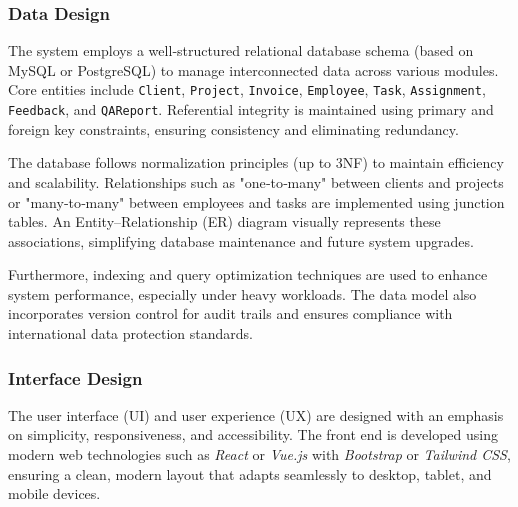 \documentclass[12pt,a4paper]{article}
\begin{document}
\subsubsection{Data Design}
The system employs a well‑structured relational database schema (based on MySQL or PostgreSQL) to manage interconnected data across various modules.  Core entities include \texttt{Client}, \texttt{Project}, \texttt{Invoice}, \texttt{Employee}, \texttt{Task}, \texttt{Assignment}, \texttt{Feedback}, and \texttt{QAReport}.  Referential integrity is maintained using primary and foreign key constraints, ensuring consistency and eliminating redundancy.

The database follows normalization principles (up to 3NF) to maintain efficiency and scalability.  Relationships such as "one‑to‑many" between clients and projects or "many‑to‑many" between employees and tasks are implemented using junction tables.  An Entity–Relationship (ER) diagram visually represents these associations, simplifying database maintenance and future system upgrades.

Furthermore, indexing and query optimization techniques are used to enhance system performance, especially under heavy workloads.  The data model also incorporates version control for audit trails and ensures compliance with international data protection standards.

\subsubsection{Interface Design}
The user interface (UI) and user experience (UX) are designed with an emphasis on simplicity, responsiveness, and accessibility.  The front end is developed using modern web technologies such as \textit{React} or \textit{Vue.js} with \textit{Bootstrap} or \textit{Tailwind CSS}, ensuring a clean, modern layout that adapts seamlessly to desktop, tablet, and mobile devices.
\end{document}
